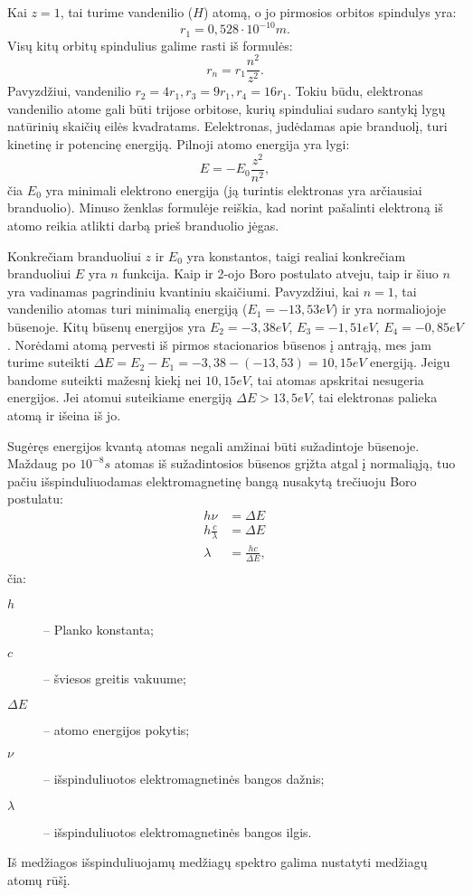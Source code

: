 Kai $z=1$, tai turime vandenilio ($H$) atomą, o jo pirmosios orbitos
spindulys yra:
\begin{equation*}
  r_{1} = 0,528 \cdot 10^{-10} m.
\end{equation*}
Visų kitų orbitų spindulius galime rasti iš formulės:
\begin{equation*}
  r_{n} = r_{1}\frac{n^{2}}{z^{2}}.
\end{equation*}
Pavyzdžiui, vandenilio $r_{2} = 4r_{1}, r_{3} = 9r_{1}, r_{4} = 16r_{1}$.
Tokiu būdu, elektronas vandenilio atome gali būti trijose orbitose,
kurių spinduliai sudaro santykį lygų natūrinių skaičių eilės
kvadratams. Eelektronas, judėdamas apie branduolį, turi kinetinę
ir potencinę energiją. Pilnoji atomo energija yra lygi:
\begin{equation*}
  E = -E_{0} \frac{z^{2}}{n^{2}},
\end{equation*}
čia $E_{0}$ yra minimali elektrono energija (ją turintis elektronas
yra arčiausiai branduolio). Minuso ženklas formulėje
reiškia, kad norint pašalinti elektroną iš atomo reikia atlikti
darbą prieš branduolio jėgas.

Konkrečiam branduoliui $z$ ir $E_{0}$ yra konstantos, taigi realiai
konkrečiam branduoliui $E$ yra $n$ funkcija. Kaip ir 2-ojo Boro
postulato atveju, taip ir šiuo $n$ yra vadinamas pagrindiniu
kvantiniu skaičiumi. Pavyzdžiui, kai $n=1$, tai vandenilio
atomas turi minimalią energiją ($E_{1} = -13,53 eV$) ir yra normaliojoje
būsenoje. Kitų būsenų energijos yra $E_{2} = -3,38eV$, $E_{3} = -1,51eV$,
$E_{4} = -0,85eV$. Norėdami atomą pervesti iš pirmos stacionarios
būsenos į antrąją, mes jam turime suteikti
$\Delta E = E_{2} - E_{1} = -3,38 - (-13,53) = 10,15 eV$ energiją.
Jeigu bandome suteikti mažesnį kiekį nei $10,15eV$, tai atomas
apskritai nesugeria energijos. Jei atomui suteikiame energiją
$\Delta E > 13,5 eV$, tai elektronas palieka atomą ir išeina iš jo.

Sugėręs energijos kvantą atomas negali amžinai būti sužadintoje
būsenoje. Maždaug po $10^{-8}s$ atomas iš sužadintosios būsenos
grįžta atgal į normaliąją, tuo pačiu išspinduliuodamas elektromagnetinę
bangą nusakytą trečiuoju Boro postulatu:
\begin{align*}
  h \nu &= \Delta E \\
  h \frac{c}{\lambda} &= \Delta E \\
  \lambda &= \frac{hc}{\Delta E}, \\
\end{align*}
čia:
\begin{description}
  \item[$h$] – Planko konstanta;
  \item[$c$] – šviesos greitis vakuume;
  \item[$\Delta E$] – atomo energijos pokytis;
  \item[$\nu$] – išspinduliuotos elektromagnetinės bangos dažnis;
  \item[$\lambda$] – išspinduliuotos elektromagnetinės bangos ilgis.
\end{description}
Iš medžiagos išspinduliuojamų medžiagų spektro galima nustatyti medžiagų
atomų rūšį.

